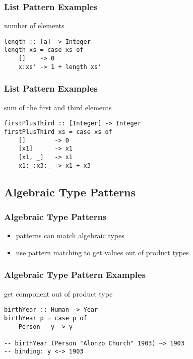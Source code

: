 \documentclass[dvipsnames]{beamer}
\theoremstyle{plain}
\begin{document}
\begin{frame}[fragile]
  \frametitle{List Pattern Examples}

  \begin{exampleblock}{number of elements}
    \begin{lstlisting}[deletekeywords={length}]
length :: [a] -> Integer
length xs = case xs of
    []    -> 0
    x:xs' -> 1 + length xs'
    \end{lstlisting}
  \end{exampleblock}
\end{frame}

\begin{frame}[fragile]
  \frametitle{List Pattern Examples}

  \begin{exampleblock}{sum of the first and third elements}
    \begin{lstlisting}
firstPlusThird :: [Integer] -> Integer
firstPlusThird xs = case xs of
    []        -> 0
    [x1]      -> x1
    [x1, _]   -> x1
    x1:_:x3:_ -> x1 + x3
    \end{lstlisting}
  \end{exampleblock}
\end{frame}

\subsection{Algebraic Type Patterns}

\begin{frame}
  \frametitle{Algebraic Type Patterns}

  \begin{itemize}
    \item patterns can match algebraic types
    \item use pattern matching to get values out of product types
  \end{itemize}
\end{frame}

\begin{frame}[fragile]
  \frametitle{Algebraic Type Pattern Examples}

  \begin{exampleblock}{get component out of product type}
    \begin{lstlisting}
birthYear :: Human -> Year
birthYear p = case p of
    Person _ y -> y

-- birthYear (Person "Alonzo Church" 1903) ~> 1903
-- binding: y <-> 1903
    \end{lstlisting}
  \end{exampleblock}
\end{frame}
\end{document}
